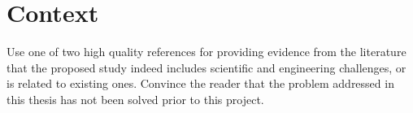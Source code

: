 \section{Context}

Use one of two high quality references for providing evidence from the literature that the proposed study indeed includes scientific and engineering challenges, or is related to existing ones.
Convince the reader that the problem addressed in this thesis has not been solved prior to this project.

